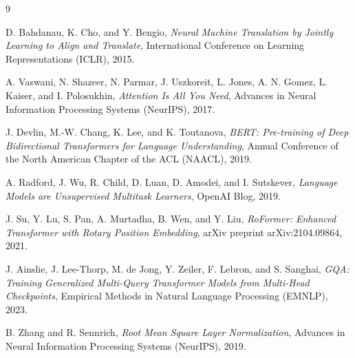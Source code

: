 \documentclass[12pt,a4paper]{article}
\begin{document}
\begin{thebibliography}{9}

D. Bahdanau, K. Cho, and Y. Bengio,
\textit{Neural Machine Translation by Jointly Learning to Align and Translate},
International Conference on Learning Representations (ICLR), 2015.

A. Vaswani, N. Shazeer, N. Parmar, J. Uszkoreit, L. Jones, A. N. Gomez, L. Kaiser, and I. Polosukhin,
\textit{Attention Is All You Need},
Advances in Neural Information Processing Systems (NeurIPS), 2017.

J. Devlin, M.-W. Chang, K. Lee, and K. Toutanova,
\textit{BERT: Pre-training of Deep Bidirectional Transformers for Language Understanding},
Annual Conference of the North American Chapter of the ACL (NAACL), 2019.

A. Radford, J. Wu, R. Child, D. Luan, D. Amodei, and I. Sutskever,
\textit{Language Models are Unsupervised Multitask Learners},
OpenAI Blog, 2019.

J. Su, Y. Lu, S. Pan, A. Murtadha, B. Wen, and Y. Liu,
\textit{RoFormer: Enhanced Transformer with Rotary Position Embedding},
arXiv preprint arXiv:2104.09864, 2021.

J. Ainslie, J. Lee-Thorp, M. de Jong, Y. Zeiler, F. Lebron, and S. Sanghai,
\textit{GQA: Training Generalized Multi-Query Transformer Models from Multi-Head Checkpoints},
Empirical Methods in Natural Language Processing (EMNLP), 2023.

B. Zhang and R. Sennrich,
\textit{Root Mean Square Layer Normalization},
Advances in Neural Information Processing Systems (NeurIPS), 2019.

\end{thebibliography}
\end{document}

